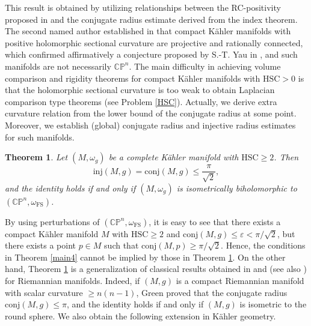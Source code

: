 \documentclass[12pt]{amsart}
\theoremstyle{plain}
\newtheorem{thm}{Theorem}[section]
\theoremstyle{definition}
\newcommand{\btheorem}{\begin{thm}}
\newcommand{\etheorem}{\end{thm}}
\newcommand{\eps}{\varepsilon}
\newcommand{\beq}{\begin{equation}}
\newcommand{\eeq}{\end{equation}}
\renewcommand{\>}{\rightarrow}
\newcommand{\C}{{\mathbb C}}
\renewcommand{\P}{{\mathbb P}}
\numberwithin{equation}{section} %
\begin{document}
	\noindent This result is obtained by utilizing relationships between the RC-positivity proposed in \cite{Yan18} 
		and the conjugate radius estimate derived from the index theorem. The second named author established in \cite{Yan18} that compact K\"ahler manifolds with positive holomorphic sectional curvature are projective and rationally connected, which confirmed affirmatively a conjecture proposed by S.-T. Yau in \cite[Problem~47]{Yau82}, and such manifolds are not necessarily $\C\P^n$.
	The main difficulty in achieving volume comparison and rigidity theorems for compact K\"ahler manifolds with $\mathrm{HSC}>0$ is that the holomorphic sectional curvature is too weak to obtain Laplacian comparison type theorems (see Problem \ref{HSC}). Actually, we derive extra curvature relation from the lower bound of the conjugate radius  at some point. 
	Moreover, we establish (global) conjugate radius and injective radius estimates for such manifolds.
	\btheorem  \label{main5} 
	Let $(M,\omega_g)$ be a complete K\"ahler manifold with $\mathrm{HSC}\ge 2$. 
	Then \beq \mathrm{inj}(M,g)=\mathrm{conj}(M,g)\leq \frac{\pi}{\sqrt{2}},\label{inj=conj}\eeq  
	and the identity holds if and only if $(M,\omega_g)$ is isometrically biholomorphic to $(\C\P^n,\omega_{\mathrm{FS}})$.
	\etheorem
	
	\noindent By using perturbations of $(\C\P^n, \omega_{\mathrm{FS}})$, 
	it is easy to see that there exists a compact K\"ahler manifold $M$ with $\mathrm{HSC}\ge 2$ and $\mathrm{conj}(M,g)\leq \eps<\pi/\sqrt{2}$, 
	but there exists a point $p\in M$ such that $\mathrm{conj}(M,p)\geq \pi/\sqrt{2}$.
	Hence, the conditions in Theorem \ref{main4} cannot be implied by those in Theorem \ref{main5}. 
	On the other hand, Theorem \ref{main5} is a generalization of classical results obtained in \cite{Kli59} and \cite{Gre63} (see also \cite{AM94}) for Riemannian manifolds. 
	Indeed, if $(M,g)$ is a compact Riemannian manifold with scalar curvature $\geq n(n-1)$, 
	Green \cite{Gre63} proved that the conjugate radius $\mathrm{conj}(M,g)\le \pi$, and the identity holds if and only if $(M,g)$ is isometric to the round sphere. 
	We also obtain the following extension in K\"ahler geometry.
	
\end{document}

